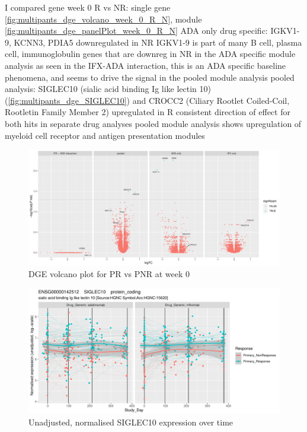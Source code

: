 \begin{outline}
I compared gene 
\1 week 0 R vs NR: single gene \autoref{fig:multipants_dge_volcano_week_0_R_N}, module \autoref{fig:multipants_dge_panelPlot_week_0_R_N}
    \2 ADA only drug specific: IGKV1-9, KCNN3, PDIA5 downregulated in NR
        \3 IGKV1-9 is part of many B cell, plasma cell, immunoglobulin genes that are downreg in NR in the ADA specific module analysis
        \3 as seen in the IFX-ADA interaction, this is an ADA specific baseline phenomena, and seems to drive the signal in the pooled module analysis
    \2 pooled analysis: SIGLEC10 (sialic acid binding Ig like lectin 10) (\autoref{fig:multipants_dge_SIGLEC10}) and CROCC2 (Ciliary Rootlet Coiled-Coil, Rootletin Family Member 2) upregulated in R
        \3 consistent direction of effect for both hits in separate drug analyses
        \3 pooled module analysis shows upregulation of myeloid cell receptor and antigen presentation modules

\begin{figure}
    \centering
    \includegraphics[width=1.0\textwidth,page=1]{mainmatter/figures/chapter_04/plot_gene_set_enrichment.dge_result_volcano_C_1RI_1NI,C_1RA_1NA,C_(1RI_1NI)_(1RA_1NA),C_1R_1N.pdf}
    \caption{DGE volcano plot for PR vs PNR at week 0}
    \label{fig:multipants_dge_volcano_week_0_R_N}
\end{figure}

\begin{figure}
    \centering
    \includegraphics[width=1.0\textwidth,page=1]{mainmatter/figures/chapter_04/dream.E_vs_Study_Day.GENEID_ENSG00000142512.SYMBOL_SIGLEC10.pdf}
    \caption{Unadjusted, normalised SIGLEC10 expression over time}
    \label{fig:multipants_dge_SIGLEC10}
\end{figure}


\end{outline}
